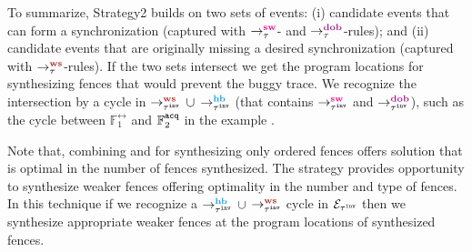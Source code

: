 To summarize, Strategy2 builds on two sets of events:
(i) candidate events that can form a synchronization 
(captured with $\setSW$- and $\setDOB$-rules); and
(ii) candidate events that are originally missing a desired
synchronization (captured with $\setWS$-rules).
If the two sets intersect we get the program locations
for synthesizing fences that would prevent the buggy trace.
We recognize the intersection by a cycle in  
$\ws{\inv{\tau}}{}{}$ $\cup$ $\hb{\inv{\tau}}{}{}$ 
(that contains $\sw{\inv{\tau}}{}{}$ and $\dob{\inv{\tau}}{}{}$), 
such as the cycle between $\mathbb{F}^\rel_1$ and 
$\mathbb{F}^\texttt{acq}_2$ in the example .

Note that, combining \sfence and \wfence for synthesizing only
\sc ordered fences offers solution that is optimal in the number
of fences synthesized. 
%
The \wfence strategy provides opportunity to synthesize weaker
fences offering optimality in the number and type of fences.
%
In this technique if we recognize a $\hb{\inv{\tau}}{}{}$ $\cup$ 
$\ws{\inv{\tau}}{}{}$ cycle in $\mathcal{E}_{{\tau}^{\mathtt{inv}}}$ then we
synthesize appropriate weaker fences at the program locations  
of synthesized fences.
